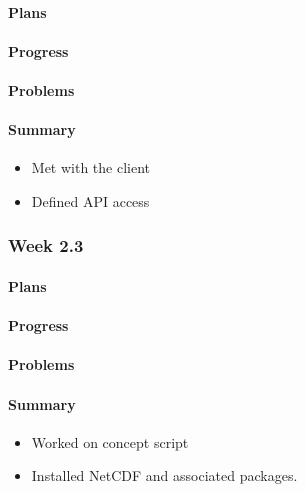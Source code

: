 \documentclass[onecolumn, draftclsnofoot,10pt, compsoc]{article}
\begin{document}
			\paragraph{Plans}

			\paragraph{Progress} \hfill \break

			\paragraph{Problems} \hfill \break

			\paragraph{Summary}\hfill \break
			    \begin{itemize}
                    \item Met with the client
                    \item Defined API access
                \end{itemize}

		\subsubsection{Week 2.3}
			\paragraph{Plans} \hfill \break

			\paragraph{Progress} \hfill \break

			\paragraph{Problems} \hfill \break

			\paragraph{Summary} \hfill \break
				\begin{itemize}
                    \item Worked on concept script
                    \item Installed NetCDF and associated packages.
                \end{itemize}
\end{document}
